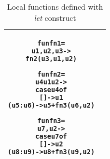 \documentclass[11pt]{article}
\begin{document}
\begin{table}[h!]
\begin{center}
\begin{tabular}{|c|c|}
\begin{minipage}{3in}
\begin{alltt}
fun fn1 = 
    u1, u2, u3 -> 
       fn2 (u3,u1,u2)

fun fn2 =
  u4 u1 u2 ->
    case u4 of 
      []      -> u1 
      (u5:u6) -> u5 + fn3 (u6,u2)    

fun fn3 =
  u7, u2 ->
    case u7 of 
      []     ->  u2 
      (u8:u9) -> u8 + fn3 (u9,u2)




\end{alltt} 
\end {minipage}
\tabularnewline
\hline
\end{tabular}
\caption{Local functions defined with {\em let} construct}
\label{LamLiftLet}
\end{center}
\end{table}
\end{document}
